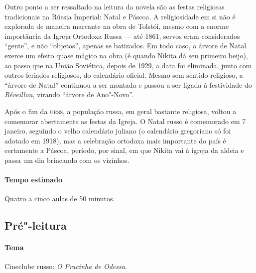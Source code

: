 \documentclass[11pt]{extarticle}
\begin{document}
Outro ponto a ser ressaltado na leitura da novela são as festas
religiosas tradicionais na Rússia Imperial: Natal e Páscoa. A
religiosidade em si não é explorada de maneira marcante na obra de
Tolstói, mesmo com a enorme importância da Igreja Ortodoxa Russa --- até
1861, servos eram considerados ``gente'', e não ``objetos'', apenas se
batizados. Em todo caso, a árvore de Natal exerce um efeito quase mágico
na obra (é quando Nikita dá seu primeiro beijo), ao passo que na União
Soviética, depois de 1929, a data foi eliminada, junto com outros
feriados religiosos, do calendário oficial. Mesmo sem sentido religioso,
a ``árvore de Natal'' continuou a ser montada e passou a ser ligada à
festividade do \emph{Réveillon}, virando ``árvore de Ano"-Novo''.


Após o fim da \textsc{urss}, a população russa, em geral bastante religiosa,
voltou a comemorar abertamente as festas da Igreja. O Natal russo é
comemorado em 7 janeiro, seguindo o velho calendário juliano (o
calendário gregoriano só foi adotado em 1918), mas a celebração ortodoxa
mais importante do país é certamente a Páscoa, período, por sinal, em
que Nikita vai à igreja da aldeia e passa um dia brincando com os
vizinhos.


\paragraph{Tempo estimado} Quatro a cinco aulas de 50 minutos.

\subsection{Pré"-leitura}

\paragraph{Tema} Cineclube russo: \emph{O Pracinha de Odessa}.

\end{document}
